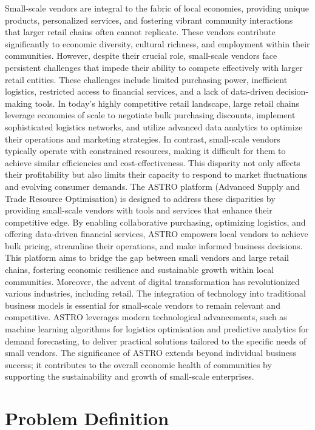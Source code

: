 Small-scale vendors are integral to the fabric of local economies, providing unique products,
personalized services, and fostering vibrant community interactions that larger retail chains
often cannot replicate. These vendors contribute significantly to economic diversity, cultural
richness, and employment within their communities. However, despite their crucial role,
small-scale vendors face persistent challenges that impede their ability to compete effectively
with larger retail entities. These challenges include limited purchasing power, inefficient logistics,
restricted access to financial services, and a lack of data-driven decision-making tools.
In today’s highly competitive retail landscape, large retail chains leverage economies of scale to
negotiate bulk purchasing discounts, implement sophisticated logistics networks, and utilize
advanced data analytics to optimize their operations and marketing strategies. In contrast,
small-scale vendors typically operate with constrained resources, making it difficult for them to
achieve similar efficiencies and cost-effectiveness. This disparity not only affects their
profitability but also limits their capacity to respond to market fluctuations and evolving
consumer demands.
The ASTRO platform (Advanced Supply and Trade Resource Optimisation) is designed to
address these disparities by providing small-scale vendors with tools and services that enhance
their competitive edge. By enabling collaborative purchasing, optimizing logistics, and offering
data-driven financial services, ASTRO empowers local vendors to achieve bulk pricing,
streamline their operations, and make informed business decisions. This platform aims to bridge
the gap between small vendors and large retail chains, fostering economic resilience and
sustainable growth within local communities.
Moreover, the advent of digital transformation has revolutionized various industries, including
retail. The integration of technology into traditional business models is essential for small-scale
vendors to remain relevant and competitive. ASTRO leverages modern technological
advancements, such as machine learning algorithms for logistics optimisation and predictive
analytics for demand forecasting, to deliver practical solutions tailored to the specific needs of
small vendors. The significance of ASTRO extends beyond individual business success; it
contributes to the overall economic health of communities by supporting the sustainability and
growth of small-scale enterprises.

\section{Problem Definition}

